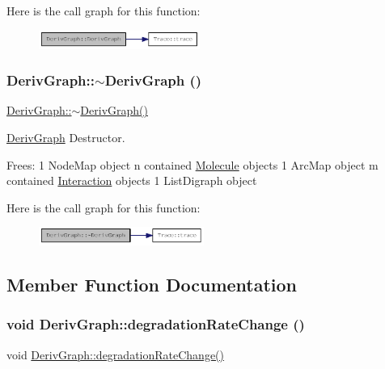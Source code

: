 Here is the call graph for this function:\nopagebreak
\begin{figure}[H]
\begin{center}
\leavevmode
\includegraphics[width=149pt]{classDerivGraph_af2a1f80b96b4657e7575748942d09947_cgraph}
\end{center}
\end{figure}
\hypertarget{classDerivGraph_a27b4fed56f8d2a745582622b7cb78b50}{
\subsubsection[{$\sim$DerivGraph}]{\setlength{\rightskip}{0pt plus 5cm}DerivGraph::$\sim$DerivGraph ()}}
\label{classDerivGraph_a27b4fed56f8d2a745582622b7cb78b50}
\hyperlink{classDerivGraph_a27b4fed56f8d2a745582622b7cb78b50}{DerivGraph::$\sim$DerivGraph()}

\hyperlink{classDerivGraph}{DerivGraph} Destructor.

Frees: 1 NodeMap object n contained \hyperlink{classMolecule}{Molecule} objects 1 ArcMap object m contained \hyperlink{classInteraction}{Interaction} objects 1 ListDigraph object 

Here is the call graph for this function:\nopagebreak
\begin{figure}[H]
\begin{center}
\leavevmode
\includegraphics[width=153pt]{classDerivGraph_a27b4fed56f8d2a745582622b7cb78b50_cgraph}
\end{center}
\end{figure}


\subsection{Member Function Documentation}
\hypertarget{classDerivGraph_a038841806aa1fe80a9450f977baa1fd2}{
\subsubsection[{degradationRateChange}]{\setlength{\rightskip}{0pt plus 5cm}void DerivGraph::degradationRateChange ()}}
\label{classDerivGraph_a038841806aa1fe80a9450f977baa1fd2}
void \hyperlink{classDerivGraph_a038841806aa1fe80a9450f977baa1fd2}{DerivGraph::degradationRateChange()}

